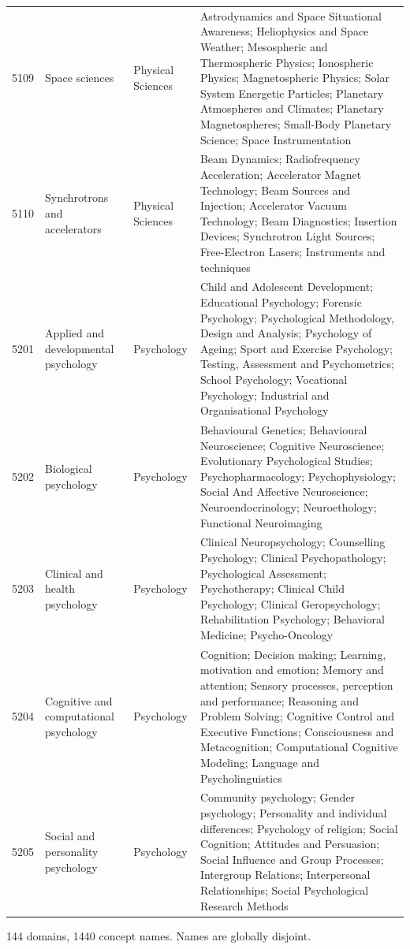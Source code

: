 \begin{longtable}{r p{2.45cm} p{2.55cm} p{6.15cm}}
5109 & Space sciences & Physical Sciences & Astrodynamics and Space Situational Awareness; Heliophysics and Space Weather; Mesospheric and Thermospheric Physics; Ionospheric Physics; Magnetospheric Physics; Solar System Energetic Particles; Planetary Atmospheres and Climates; Planetary Magnetospheres; Small-Body Planetary Science; Space Instrumentation \\
5110 & Synchrotrons and accelerators & Physical Sciences & Beam Dynamics; Radiofrequency Acceleration; Accelerator Magnet Technology; Beam Sources and Injection; Accelerator Vacuum Technology; Beam Diagnostics; Insertion Devices; Synchrotron Light Sources; Free-Electron Lasers; Instruments and techniques \\
5201 & Applied and developmental psychology & Psychology & Child and Adolescent Development; Educational Psychology; Forensic Psychology; Psychological Methodology, Design and Analysis; Psychology of Ageing; Sport and Exercise Psychology; Testing, Assessment and Psychometrics; School Psychology; Vocational Psychology; Industrial and Organisational Psychology \\
5202 & Biological psychology & Psychology & Behavioural Genetics; Behavioural Neuroscience; Cognitive Neuroscience; Evolutionary Psychological Studies; Psychopharmacology; Psychophysiology; Social And Affective Neuroscience; Neuroendocrinology; Neuroethology; Functional Neuroimaging \\
5203 & Clinical and health psychology & Psychology & Clinical Neuropsychology; Counselling Psychology; Clinical Psychopathology; Psychological Assessment; Psychotherapy; Clinical Child Psychology; Clinical Geropsychology; Rehabilitation Psychology; Behavioral Medicine; Psycho-Oncology \\
5204 & Cognitive and computational psychology & Psychology & Cognition; Decision making; Learning, motivation and emotion; Memory and attention; Sensory processes, perception and performance; Reasoning and Problem Solving; Cognitive Control and Executive Functions; Consciousness and Metacognition; Computational Cognitive Modeling; Language and Psycholinguistics \\
5205 & Social and personality psychology & Psychology & Community psychology; Gender psychology; Personality and individual differences; Psychology of religion; Social Cognition; Attitudes and Persuasion; Social Influence and Group Processes; Intergroup Relations; Interpersonal Relationships; Social Psychological Research Methods \\
\end{longtable}
{\small 144 domains, 1440 concept names. Names are globally disjoint.}
\endgroup
